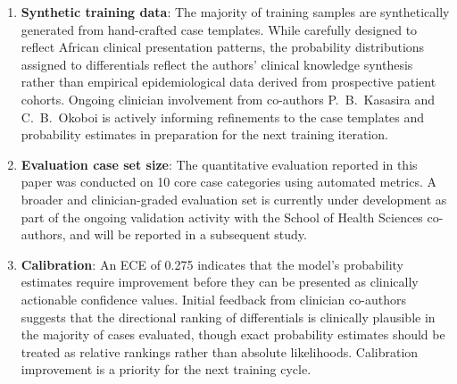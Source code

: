 \documentclass[conference]{IEEEtran}
\begin{document}
\begin{enumerate}
  \item \textbf{Synthetic training data}: The majority of training
        samples are synthetically generated from hand-crafted case
        templates. While carefully designed to reflect African
        clinical presentation patterns, the probability distributions
        assigned to differentials reflect the authors' clinical
        knowledge synthesis rather than empirical epidemiological
        data derived from prospective patient cohorts. Ongoing
        clinician involvement from co-authors P.~B.~Kasasira and
        C.~B.~Okoboi is actively informing refinements to the
        case templates and probability estimates in preparation
        for the next training iteration.

  \item \textbf{Evaluation case set size}: The quantitative
        evaluation reported in this paper was conducted on 10 core
        case categories using automated metrics. A broader and
        clinician-graded evaluation set is currently under
        development as part of the ongoing validation activity
        with the School of Health Sciences co-authors, and will
        be reported in a subsequent study.

  \item \textbf{Calibration}: An ECE of 0.275 indicates that the
        model's probability estimates require improvement before
        they can be presented as clinically actionable confidence
        values. Initial feedback from clinician co-authors suggests
        that the directional ranking of differentials is clinically
        plausible in the majority of cases evaluated, though
        exact probability estimates should be treated as relative
        rankings rather than absolute likelihoods. Calibration
        improvement is a priority for the next training cycle.


\end{enumerate}
\end{document}
